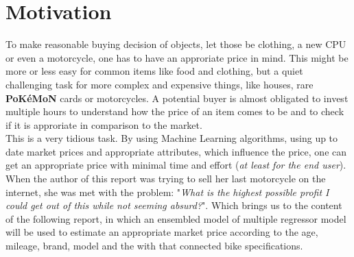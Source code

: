 \section{Motivation}
\label{sec:Motivation}

To make reasonable buying decision of objects, let those be clothing, a new CPU or even a motorcycle, one has to have 
an approriate price in mind. This might be more or less easy for common items like food and clothing, but a quiet challenging task for more complex and expensive things, like
houses, rare \textbf{PoKéMoN} cards or motorcycles. A potential buyer is almost obligated to invest multiple hours to understand
how the price of an item comes to be and to check if it is approriate in comparison to the market.\\
This is a very tidious task. By using Machine Learning algorithms, using up to date market prices and appropriate attributes, which
influence the price, one can get an appropriate price with minimal time and effort (\textit{at least for the end user}).
When the author of this report was trying to sell her last motorcycle on the internet, she was met with the problem: "\textit{What is the highest possible profit
I could get out of this while not seeming absurd?}". Which brings us to the content of the following report, in which an ensembled model
of multiple regressor model will be used to estimate an appropriate market price according to the age, mileage, brand, model and the
with that connected bike specifications.